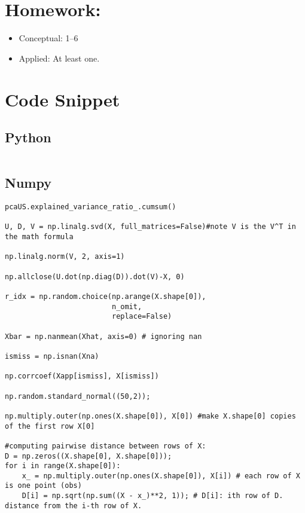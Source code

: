 \documentclass[
  letterpaper,
  DIV=11,
  numbers=noendperiod]{scrreprt}
\providecommand{\tightlist}{%
  \setlength{\itemsep}{0pt}\setlength{\parskip}{0pt}}\usepackage{longtable,booktabs,array}
\begin{document}
\section{Homework:}\label{homework-8}

\begin{itemize}
\tightlist
\item
  Conceptual: 1--6
\item
  Applied: At least one.
\end{itemize}

\section{Code Snippet}\label{code-snippet-6}

\subsection{Python}\label{python-10}

\begin{verbatim}

\end{verbatim}

\subsection{Numpy}\label{numpy-10}

\begin{verbatim}
pcaUS.explained_variance_ratio_.cumsum()

U, D, V = np.linalg.svd(X, full_matrices=False)#note V is the V^T in the math formula

np.linalg.norm(V, 2, axis=1)

np.allclose(U.dot(np.diag(D)).dot(V)-X, 0)

r_idx = np.random.choice(np.arange(X.shape[0]),
                         n_omit,
                         replace=False)

Xbar = np.nanmean(Xhat, axis=0) # ignoring nan

ismiss = np.isnan(Xna)

np.corrcoef(Xapp[ismiss], X[ismiss])

np.random.standard_normal((50,2));

np.multiply.outer(np.ones(X.shape[0]), X[0]) #make X.shape[0] copies of the first row X[0]

#computing pairwise distance between rows of X:
D = np.zeros((X.shape[0], X.shape[0]));
for i in range(X.shape[0]):
    x_ = np.multiply.outer(np.ones(X.shape[0]), X[i]) # each row of X is one point (obs)
    D[i] = np.sqrt(np.sum((X - x_)**2, 1)); # D[i]: ith row of D. distance from the i-th row of X.
\end{verbatim}
\end{document}
